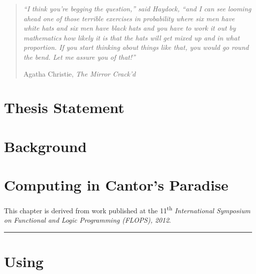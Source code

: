 \documentclass[phd,electronic,twosidetoc,letterpaper,chaptercenter,parttop,lof]{byumsphd}
\title{\Title}
\author{\Author}
\begin{document}
\maketitle
{}

\vspace*{\fill}
\begin{quote}
\textit{``I think you're begging the question,'' said Haydock, ``and I can see looming ahead one of those terrible exercises in probability where six men have white hats and six men have black hats and you have to work it out by mathematics how likely it is that the hats will get mixed up and in what proportion. If you start thinking about things like that, you would go round the bend. Let me assure you of that!''}

\hfill Agatha Christie, \textit{The Mirror Crack'd}
\end{quote}
\vspace*{\fill}

\chapter{Thesis Statement}




\chapter{Background}




\chapter{Computing in Cantor's Paradise}
\label{ch:lambda-zfc}

This chapter is derived from work published at the 11\textsuperscript{th} \emph{International Symposium on Functional and Logic Programming (FLOPS), 2012}.

\vspace{\baselineskip}
\hrule
\vspace{\baselineskip}




\chapter{Using \lzfclang}
\label{ch:using-lambda-zfc}
\end{document}
